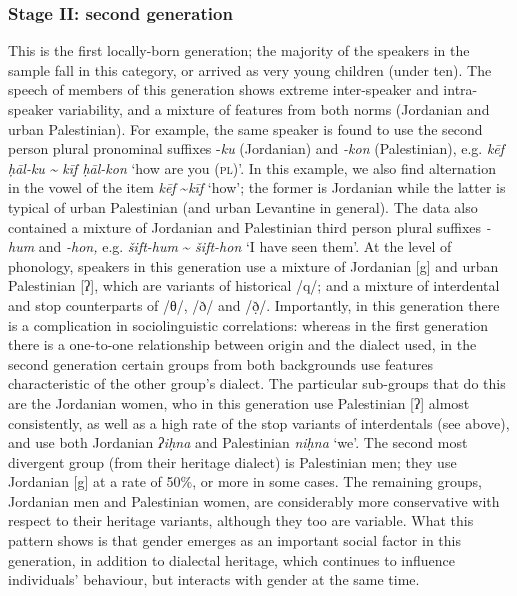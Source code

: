 \documentclass[output=paper]{langsci/langscibook}
\begin{document}
\subsubsection{Stage II: second generation}
This is the first locally-born generation; the majority of the speakers in the sample fall in this category, or arrived as very young children (under ten). The speech of members of this generation shows extreme inter-speaker and intra-speaker variability, and a mixture of features from both norms (Jordanian and urban Palestinian). For example, the same speaker is found to use the second person plural pronominal suffixes -\textit{ku} (Jordanian) and \textit{{}-kon} (Palestinian), e.g. \textit{kēf} \textit{ḥāl-ku} \textit{{\textasciitilde} kīf ḥāl-kon} ‘how are you (\textsc{pl})'. In this example, we also find alternation in the vowel of the item \textit{kēf} {\textasciitilde}\textit{kīf} ‘how’; the former is Jordanian while the latter is typical of urban Palestinian (and urban Levantine in general). The data also contained a mixture of Jordanian and Palestinian third person plural suffixes \textit{{}-hum} and \textit{\--hon,} e.g. \textit{šift-hum} {\textasciitilde} \textit{šift-hon} ‘I have seen them’. At the level of phonology, speakers in this generation use a mixture of Jordanian [g] and urban Palestinian [ʔ], which are variants of historical /q/; and a mixture of interdental and stop counterparts of /θ/, /ð/ and /ð̣/. Importantly, in this generation there is a complication in sociolinguistic correlations: whereas in the first generation there is a one-to-one relationship between origin and the dialect used, in the second generation certain groups from both backgrounds use features characteristic of the other group’s dialect. The particular sub-groups that do this are the Jordanian women, who in this generation use Palestinian [ʔ] almost consistently, as well as a high rate of the stop variants of interdentals (see above), and use both Jordanian \textit{ʔiḥna} and Palestinian \textit{niḥna} ‘we’. The second most divergent group (from their heritage dialect) is Palestinian men; they use Jordanian [g] at a rate of 50\%, or more in some cases. The remaining groups, Jordanian men and Palestinian women, are considerably more conservative with respect to their heritage variants, although they too are variable. What this pattern shows is that gender emerges as an important social factor in this generation, in addition to dialectal heritage, which continues to influence individuals’ behaviour, but interacts with gender at the same time. 
\end{document}
